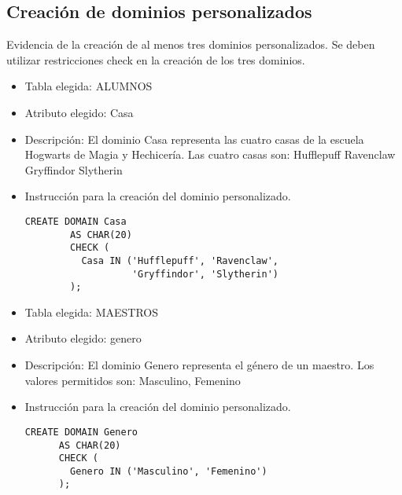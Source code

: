\subsection{Creación de dominios personalizados}

Evidencia de la creación de al menos tres dominios personalizados. Se deben utilizar restricciones check en la creación de los tres dominios.
\begin{itemize}
    \item Tabla elegida: ALUMNOS
    \item Atributo elegido: Casa
    \item Descripción: El dominio Casa representa las cuatro casas de la escuela Hogwarts de Magia y Hechicería. Las cuatro casas son: Hufflepuff Ravenclaw Gryffindor Slytherin
    \item Instrucción para la creación del dominio personalizado.
    \begin{lstlisting}[caption={Tablas para la BdDatos}, label={lst:sql_estadios}]
      CREATE DOMAIN Casa
        AS CHAR(20)
        CHECK (
          Casa IN ('Hufflepuff', 'Ravenclaw', 
                   'Gryffindor', 'Slytherin')
        );      
    \end{lstlisting}
\end{itemize}


\begin{itemize}
    \item Tabla elegida: MAESTROS
    \item Atributo elegido: genero
    \item Descripción: El dominio Genero representa el género de un maestro. Los valores permitidos son: Masculino, Femenino
    \item Instrucción para la creación del dominio personalizado.
    
    \begin{lstlisting}[caption={Tablas para la BdDatos}, label={lst:sql_estadios}]
      CREATE DOMAIN Genero
      AS CHAR(20)
      CHECK (
        Genero IN ('Masculino', 'Femenino')
      );      
    \end{lstlisting}    
\end{itemize}


